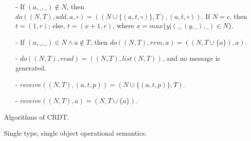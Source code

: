 \begin{example}[RGA]
\begin{itemize}
\item[-] If $(a,\_,\_) \notin N$, then $\mathit{do}((N,T),\mathit{add},a,\circ) = ((N \cup \{ (a,t,\circ) \},T),(a,t,\circ))$. If $N = \epsilon$, then $t = (1,r)$; else, $t = (x+1,r)$, where $x = \mathit{max}\{ y \vert (\_,(y,\_),\_) \in N \}$. 

\item[-] If $(a,\_,\_) \in N \wedge a \notin T$, then $\mathit{do}((N,T),\mathit{rem},a) = ((N,T \cup \{ a \} ),a)$. 

\item[-] $\mathit{do}((N,T),\mathit{read}) = ((N,T),\mathit{list}(N,T))$, and no message is generated. 

\item[-] $\mathit{receive}((N,T),(a,t,p)) = (N \cup \{ (a,t,p) \},T)$. 

\item[-] $\mathit{receive}((N,T),a) = (N,T \cup \{ a \})$. 
\end{itemize} 
\end{example}



Algorithms of CRDT.

Single type, single object operational semantics.





